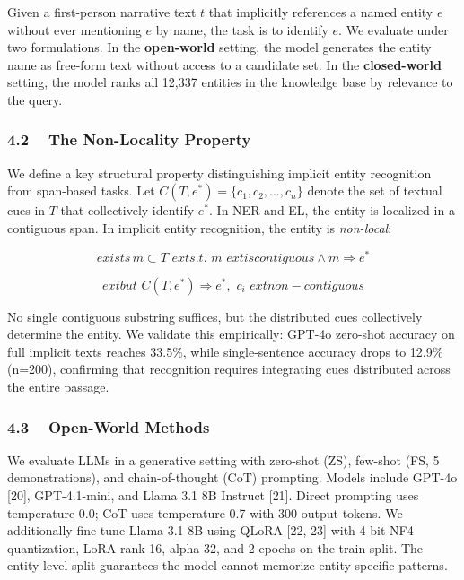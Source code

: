 \documentclass[
]{article}
\begin{document}
Given a first-person narrative text \(t\) that implicitly references a
named entity \(e\) without ever mentioning \(e\) by name, the task is to
identify \(e\). We evaluate under two formulations. In the
\textbf{open-world} setting, the model generates the entity name as
free-form text without access to a candidate set. In the
\textbf{closed-world} setting, the model ranks all 12,337 entities in
the knowledge base by relevance to the query.

\subsubsection{4.2 ~ The Non-Locality
Property}\label{the-non-locality-property}

We define a key structural property distinguishing implicit entity
recognition from span-based tasks. Let
\(C\left( T,e^{*} \right) = \{ c_{1},c_{2},\ldots,c_{n}\}\) denote the
set of textual cues in \(T\) that collectively identify \(e^{*}\). In
NER and EL, the entity is localized in a contiguous span. In implicit
entity recognition, the entity is \emph{non-local}:

\[exists\, m \subset T\mspace{6mu} exts.t.\mspace{6mu} m\mspace{6mu} extiscontiguous \land m \Rightarrow e^{*}\]

\[extbut\mspace{6mu} C\left( T,e^{*} \right) \Rightarrow e^{*},\mspace{6mu} c_{i}\mspace{6mu} extnon - contiguous\]

No single contiguous substring suffices, but the distributed cues
collectively determine the entity. We validate this empirically: GPT-4o
zero-shot accuracy on full implicit texts reaches 33.5\%, while
single-sentence accuracy drops to 12.9\% (n=200), confirming that
recognition requires integrating cues distributed across the entire
passage.

\subsubsection{4.3 ~ Open-World Methods}\label{open-world-methods}

We evaluate LLMs in a generative setting with zero-shot (ZS), few-shot
(FS, 5 demonstrations), and chain-of-thought (CoT) prompting. Models
include GPT-4o {[}20{]}, GPT-4.1-mini, and Llama 3.1 8B Instruct
{[}21{]}. Direct prompting uses temperature 0.0; CoT uses temperature
0.7 with 300 output tokens. We additionally fine-tune Llama 3.1 8B using
QLoRA {[}22, 23{]} with 4-bit NF4 quantization, LoRA rank 16, alpha 32,
and 2 epochs on the train split. The entity-level split guarantees the
model cannot memorize entity-specific patterns.
\end{document}
